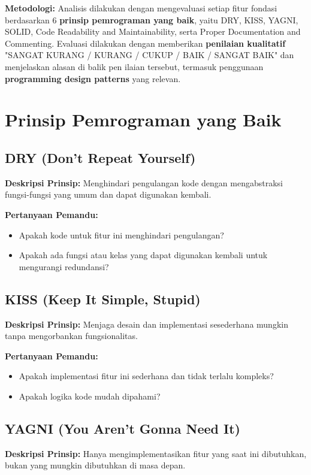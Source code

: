 \documentclass[12pt]{article}
\begin{document}
\textbf{Metodologi:} Analisis dilakukan dengan mengevaluasi setiap fitur fondasi berdasarkan 6 \textbf{prinsip pemrograman yang baik}, yaitu DRY, KISS, YAGNI, SOLID, Code Readability and Maintainability, serta Proper Documentation and Commenting. Evaluasi dilakukan dengan memberikan \textbf{ penilaian kualitatif} "SANGAT KURANG / KURANG / CUKUP / BAIK / SANGAT BAIK" dan menjelaskan alasan di balik pen ilaian tersebut, termasuk penggunaan \textbf{programming design patterns} yang relevan.

\section{Prinsip Pemrograman yang Baik}
\subsection{DRY (Don't Repeat Yourself)}
\textbf{Deskripsi Prinsip:} Menghindari pengulangan kode dengan mengabstraksi fungsi-fungsi yang umum dan dapat digunakan kembali.

\textbf{Pertanyaan Pemandu:}
\begin{itemize}
    \item Apakah kode untuk fitur ini menghindari pengulangan?
    \item Apakah ada fungsi atau kelas yang dapat digunakan kembali untuk mengurangi redundansi?
\end{itemize}

\subsection{KISS (Keep It Simple, Stupid)}
\textbf{Deskripsi Prinsip:} Menjaga desain dan implementasi sesederhana mungkin tanpa mengorbankan fungsionalitas.

\textbf{Pertanyaan Pemandu:}
\begin{itemize}
    \item Apakah implementasi fitur ini sederhana dan tidak terlalu kompleks?
    \item Apakah logika kode mudah dipahami?
\end{itemize}

\subsection{YAGNI (You Aren't Gonna Need It)}
\textbf{Deskripsi Prinsip:} Hanya mengimplementasikan fitur yang saat ini dibutuhkan, bukan yang mungkin dibutuhkan di masa depan.
\end{document}
